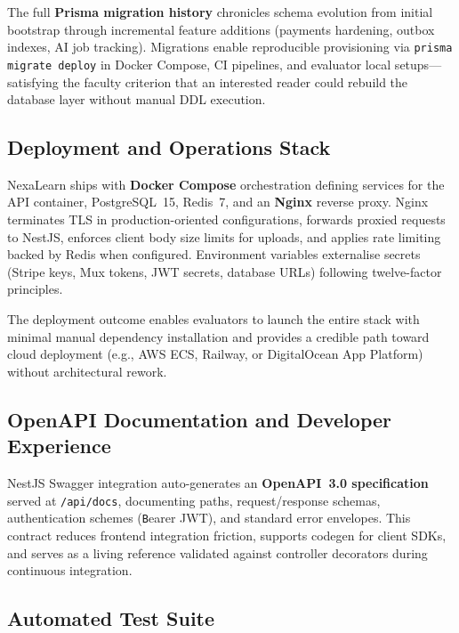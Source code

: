 The full \textbf{Prisma migration history} chronicles schema evolution from initial bootstrap through incremental feature additions (payments hardening, outbox indexes, AI job tracking). Migrations enable reproducible provisioning via \texttt{prisma migrate deploy} in Docker Compose, CI pipelines, and evaluator local setups---satisfying the faculty criterion that an interested reader could rebuild the database layer without manual DDL execution.

\subsection{Deployment and Operations Stack}
\label{subsec:outcome-deployment}

NexaLearn ships with \textbf{Docker Compose} orchestration defining services for the API container, PostgreSQL~15, Redis~7, and an \textbf{Nginx} reverse proxy. Nginx terminates TLS in production-oriented configurations, forwards proxied requests to NestJS, enforces client body size limits for uploads, and applies rate limiting backed by Redis when configured. Environment variables externalise secrets (Stripe keys, Mux tokens, JWT secrets, database URLs) following twelve-factor principles.

The deployment outcome enables evaluators to launch the entire stack with minimal manual dependency installation and provides a credible path toward cloud deployment (e.g., AWS ECS, Railway, or DigitalOcean App Platform) without architectural rework.

\subsection{OpenAPI Documentation and Developer Experience}
\label{subsec:outcome-openapi}

NestJS Swagger integration auto-generates an \textbf{OpenAPI~3.0 specification} served at \texttt{/api/docs}, documenting paths, request/response schemas, authentication schemes (\texttt Bearer JWT), and standard error envelopes. This contract reduces frontend integration friction, supports codegen for client SDKs, and serves as a living reference validated against controller decorators during continuous integration.

\subsection{Automated Test Suite}
\label{subsec:outcome-tests}


